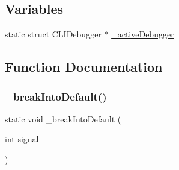 \subsection*{Variables}
\begin{DoxyCompactItemize}
\item 
static struct C\+L\+I\+Debugger $\ast$ \mbox{\hyperlink{cli-el-backend_8c_aad6d36371c8ad26b4c9a901bafa8d03c}{\+\_\+active\+Debugger}}
\end{DoxyCompactItemize}


\subsection{Function Documentation}
\mbox{\label{cli-el-backend_8c_ae0f25b9ee80b2ca1d806da7e83dd70da}} 
\subsubsection{\texorpdfstring{\+\_\+break\+Into\+Default()}{\_breakIntoDefault()}}
{\footnotesize\ttfamily static void \+\_\+break\+Into\+Default (\begin{DoxyParamCaption}\item[{\mbox{\hyperlink{ioapi_8h_a787fa3cf048117ba7123753c1e74fcd6}{int}}}]{signal }\end{DoxyParamCaption})\hspace{0.3cm}{\ttfamily [static]}}

